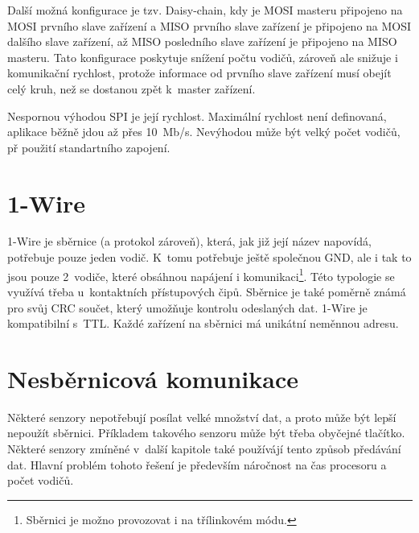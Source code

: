 Další možná konfigurace je tzv. Daisy-chain, kdy je  MOSI masteru připojeno na MOSI prvního slave zařízení a MISO prvního slave zařízení je připojeno na MOSI dalšího slave zařízení, až MISO posledního slave zařízení je připojeno na MISO masteru.
Tato konfigurace poskytuje snížení počtu vodičů, zároveň ale snižuje i komunikační rychlost, protože informace od prvního slave zařízení musí obejít celý kruh, než se dostanou zpět k~master zařízení.

Nespornou výhodou SPI je její rychlost.
Maximální rychlost není definovaná, aplikace běžně jdou až přes 10~Mb/s.
Nevýhodou může být velký počet vodičů, př použití standartního zapojení.


\section{1-Wire}
1-Wire \cite{one-wire} je sběrnice (a protokol zároveň), která, jak již její název napovídá, potřebuje pouze jeden vodič.
K~tomu potřebuje ještě společnou GND, ale i tak to jsou pouze 2~vodiče, které obsáhnou napájení i komunikaci\footnote{Sběrnici je možno provozovat i na třílinkovém módu.}.
Této typologie se využívá třeba u~kontaktních přístupových čipů.
Sběrnice je také poměrně známá pro svůj CRC součet, který umožňuje kontrolu odeslaných dat.
1-Wire je kompatibilní s~TTL.
Každé zařízení na sběrnici má unikátní neměnnou adresu.


\section{Nesběrnicová komunikace}
Některé senzory nepotřebují posílat velké množství dat, a proto může být lepší nepoužít sběrnici. 
Příkladem takového senzoru může být třeba obyčejné tlačítko.
Některé senzory zmíněné v~další kapitole také používájí tento způsob předávání dat.
Hlavní problém tohoto řešení je především náročnost na čas procesoru a počet vodičů.

